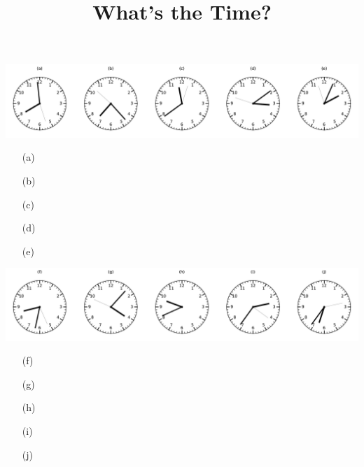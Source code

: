 \documentclass[a4paper, 11pt]{article}
\title{What's the Time?}
\date{}
\author{}
\begin{document}
\maketitle

\includegraphics[width=\textwidth]{clocks_1_0.pdf}
\begin{enumerate}\item[(a)] \dotfill\bigskip
\item[(b)] \dotfill\bigskip
\item[(c)] \dotfill\bigskip
\item[(d)] \dotfill\bigskip
\item[(e)] \dotfill\bigskip
\end{enumerate}\includegraphics[width=\textwidth]{clocks_1_1.pdf}
\begin{enumerate}\item[(f)] \dotfill\bigskip
\item[(g)] \dotfill\bigskip
\item[(h)] \dotfill\bigskip
\item[(i)] \dotfill\bigskip
\item[(j)] \dotfill\bigskip
\end{enumerate}
\end{document}
